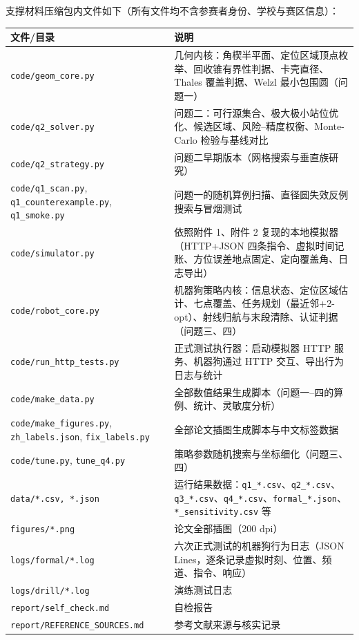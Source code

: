 \documentclass{cumcmthesis}
\begin{document}
支撑材料压缩包内文件如下（所有文件均不含参赛者身份、学校与赛区信息）：

\begin{longtable}{p{6.6cm}p{8.4cm}}
\toprule
文件/目录 & 说明\\
\midrule
\endhead
\texttt{code/geom\_core.py} & 几何内核：角楔半平面、定位区域顶点枚举、回收锥有界性判据、卡壳直径、Thales 覆盖判据、Welzl 最小包围圆（问题一）\\
\texttt{code/q2\_solver.py} & 问题二：可行源集合、极大极小站位优化、候选区域、风险--精度权衡、Monte-Carlo 检验与基线对比\\
\texttt{code/q2\_strategy.py} & 问题二早期版本（网格搜索与垂直族研究）\\
\texttt{code/q1\_scan.py}, \texttt{q1\_counterexample.py}, \texttt{q1\_smoke.py} & 问题一的随机算例扫描、直径圆失效反例搜索与冒烟测试\\
\texttt{code/simulator.py} & 依照附件 1、附件 2 复现的本地模拟器（HTTP+JSON 四条指令、虚拟时间记账、方位误差地点固定、定向覆盖角、日志导出）\\
\texttt{code/robot\_core.py} & 机器狗策略内核：信息状态、定位区域估计、七点覆盖、任务规划（最近邻+2-opt）、射线归航与末段清除、认证判据（问题三、四）\\
\texttt{code/run\_http\_tests.py} & 正式测试执行器：启动模拟器 HTTP 服务、机器狗通过 HTTP 交互、导出行为日志与统计\\
\texttt{code/make\_data.py} & 全部数值结果生成脚本（问题一--四的算例、统计、灵敏度分析）\\
\texttt{code/make\_figures.py}, \texttt{zh\_labels.json}, \texttt{fix\_labels.py} & 全部论文插图生成脚本与中文标签数据\\
\texttt{code/tune.py}, \texttt{tune\_q4.py} & 策略参数随机搜索与坐标细化（问题三、四）\\
\texttt{data/*.csv, *.json} & 运行结果数据：\texttt{q1\_*.csv}、\texttt{q2\_*.csv}、\texttt{q3\_*.csv}、\texttt{q4\_*.csv}、\texttt{formal\_*.json}、\texttt{*\_sensitivity.csv} 等\\
\texttt{figures/*.png} & 论文全部插图（200 dpi）\\
\texttt{logs/formal/*.log} & 六次正式测试的机器狗行为日志（JSON Lines，逐条记录虚拟时刻、位置、频道、指令、响应）\\
\texttt{logs/drill/*.log} & 演练测试日志\\
\texttt{report/self\_check.md} & 自检报告\\
\texttt{report/REFERENCE\_SOURCES.md} & 参考文献来源与核实记录\\
\bottomrule
\end{longtable}
\end{document}
